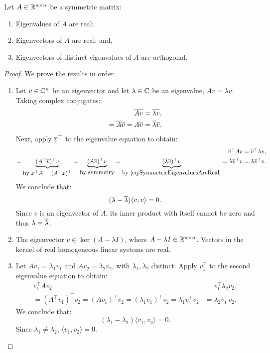 \begin{lemma}\label{lemma:SymmetricEigenvaluesAreReal}
Let $A\in\mathbb{R}^{n\times n}$ be a symmetric matrix:
\begin{enumerate}
\item Eigenvalues of $A$ are real;
\item Eigenvectors of $A$ are real; and,
\item Eigenvectors of distinct eigenvalues of $A$ are orthogonal.
\end{enumerate}
\end{lemma}
\begin{proof} We prove the results in order.
\begin{enumerate}
\item Let $v\in\mathbb{C}^n$ be an eigenvector and let $\lambda\in\mathbb{C}$ be an eigenvalue, $Av=\lambda v$. Taking complex conjugates:
\begin{align}
\overline{Av} & = \overline{\lambda v},\nonumber\\
=\overline{A}\overline{v} = A\overline{v} & = \overline{\lambda}\overline{v}.\label{eq:SymmetricEigenvaluesAreReal}
\end{align}
Next, apply $\overline{v}^\top$ to the eigenvalue equation to obtain:
\begin{align*}
\overline{v}^\top Av & = \overline{v}^\top \lambda v,\\
=\underbrace{(A^\top\overline{v})^\top v}_{\hbox{by $x^\top A = (A^\top x)^\top$}} = \underbrace{(A\overline{v})^\top v}_{\hbox{by symmetry}} = \underbrace{(\overline{\lambda}\overline{v})^\top v}_{\hbox{by~\eqref{eq:SymmetricEigenvaluesAreReal}}} = \overline{\lambda}\overline{v}^\top v & = \lambda\overline{v}^\top v.
\end{align*}
We conclude that:
\[
(\lambda-\overline{\lambda})\langle v, v\rangle = 0.
\]
Since $v$ is an eigenvector of $A$, its inner product with itself cannot be zero and thus $\lambda = \overline{\lambda}$.
\item The eigenvector $v\in\ker(A-\lambda I)$, where $A-\lambda I\in\mathbb{R}^{n\times n}$. Vectors in the kernel of real homogeneous linear systems are real.
\item Let $Av_1 = \lambda_1v_1$ and $Av_2 = \lambda_2v_2$, with $\lambda_1,\lambda_2$ distinct. Apply $v_1^\top$ to the second eigenvalue equation to obtain:
\begin{align*}
v_1^\top Av_2 & = v_1^\top \lambda_2v_2,\\
= (A^\top v_1)^\top v_2 = (A v_1)^\top v_2 = (\lambda_1v_1)^\top v_2 = \lambda_1v_1^\top v_2 & = \lambda_2 v_1^\top v_2.
\end{align*}
We conclude that:
\[
(\lambda_1-\lambda_2)\langle v_1, v_2\rangle = 0.
\]
Since $\lambda_1\ne\lambda_2$, $\langle v_1,v_2\rangle = 0$.
\end{enumerate}
\end{proof}

